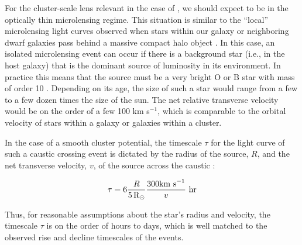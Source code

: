 For the cluster-scale lens relevant in the case of \spock, we should
expect to be in the optically thin microlensing regime.  This
situation is similar to the ``local'' microlensing light curves
observed when stars within our galaxy or neighboring dwarf galaxies
pass behind a massive compact halo object \citep{Paczynski:1986,
  Alcock:1993, Aubourg:1993, Udalski:1993}.  In this case, an isolated
microlensing event can occur if there is a background star (i.e., in
the \spock host galaxy) that is the dominant source of luminosity in
its environment. In practice this means that the source must be a very
bright O or B star with mass of order 10 \Msun.  Depending on its age,
the size of such a star would range from a few to a few dozen times
the size of the sun.  The net relative transverse velocity would be on
the order of a few 100 km s$^{-1}$, which is comparable to the orbital
velocity of stars within a galaxy or galaxies within a cluster.

In the case of a smooth cluster potential, the timescale $\tau$ for
the light curve of such a caustic crossing event is dictated by the
radius of the source, $R$, and the net transverse velocity, $v$, of
the source across the caustic
\citep{Chang:1979,Chang:1984,MiraldaEscude:1991}:

\begin{equation}
  \tau = 6\frac{R}{5\,\mbox{R$_{\odot}$}}\frac{300 {\rm km~ s}^{-1}}{v}~\rm{hr}
\label{eqn:caustic_crossing_time}
\end{equation}

\noindent Thus, for reasonable assumptions about the star's radius and
velocity, the timescale $\tau$ is on the order of hours to days, which is well
matched to the observed rise and decline timescales of the \spock
events.


